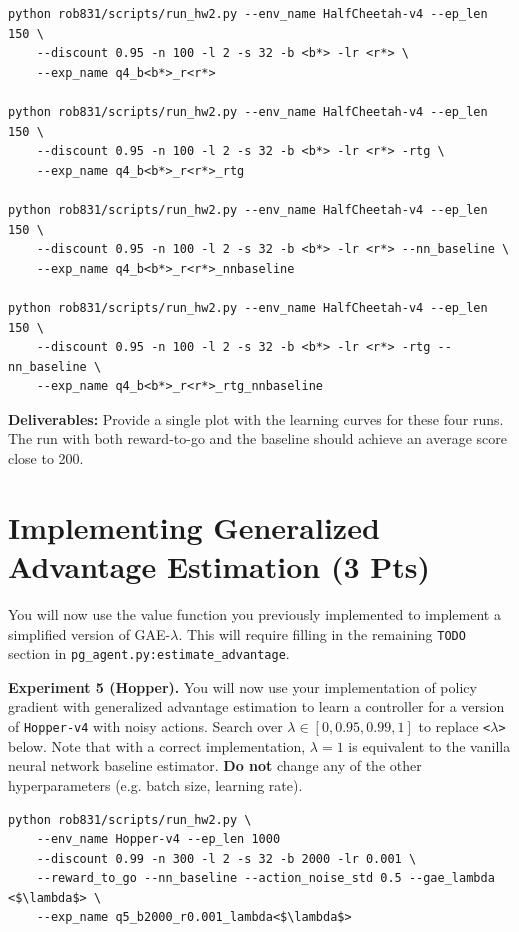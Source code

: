 \documentclass{article}
\begin{document}
\begin{lstlisting}
python rob831/scripts/run_hw2.py --env_name HalfCheetah-v4 --ep_len 150 \ 
    --discount 0.95 -n 100 -l 2 -s 32 -b <b*> -lr <r*> \ 
    --exp_name q4_b<b*>_r<r*>

python rob831/scripts/run_hw2.py --env_name HalfCheetah-v4 --ep_len 150 \ 
    --discount 0.95 -n 100 -l 2 -s 32 -b <b*> -lr <r*> -rtg \ 
    --exp_name q4_b<b*>_r<r*>_rtg

python rob831/scripts/run_hw2.py --env_name HalfCheetah-v4 --ep_len 150 \ 
    --discount 0.95 -n 100 -l 2 -s 32 -b <b*> -lr <r*> --nn_baseline \
    --exp_name q4_b<b*>_r<r*>_nnbaseline

python rob831/scripts/run_hw2.py --env_name HalfCheetah-v4 --ep_len 150 \ 
    --discount 0.95 -n 100 -l 2 -s 32 -b <b*> -lr <r*> -rtg --nn_baseline \
    --exp_name q4_b<b*>_r<r*>_rtg_nnbaseline
\end{lstlisting}
\textbf{Deliverables:}
Provide a single plot with the learning curves for these four runs. The run with both reward-to-go and the baseline should achieve an average score close to 200. 


\section{Implementing Generalized Advantage Estimation (3 Pts)}
\label{sec:gae}

You will now use the value function you previously implemented to implement a simplified version of GAE-$\lambda$. This will require filling in the remaining \texttt{TODO} section in \texttt{pg\_agent.py:estimate\_advantage}.  

\vspace{0.2in}
\textbf{Experiment 5 (Hopper).} You will now use your implementation of policy gradient with generalized advantage estimation to learn a controller for a version of \verb|Hopper-v4| with noisy actions. Search over $\lambda \in [0, 0.95, 0.99, 1]$ to replace \texttt{<$\lambda$>} below. Note that with a correct implementation, $\lambda = 1$ is equivalent to the vanilla neural network baseline estimator. \textbf{Do not} change any of the other hyperparameters (e.g. batch size, learning rate).

\begin{lstlisting}[mathescape=true]
python rob831/scripts/run_hw2.py \ 
    --env_name Hopper-v4 --ep_len 1000 
    --discount 0.99 -n 300 -l 2 -s 32 -b 2000 -lr 0.001 \
    --reward_to_go --nn_baseline --action_noise_std 0.5 --gae_lambda <$\lambda$> \ 
    --exp_name q5_b2000_r0.001_lambda<$\lambda$>
\end{lstlisting}
\end{document}
